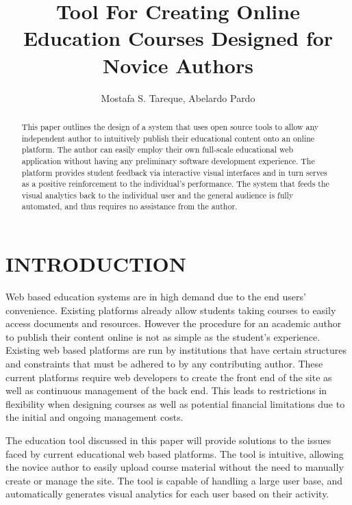 \documentclass[a4paper, 11pt, conference]{ieeeconf}
\title{\LARGE \bf Tool For Creating Online Education Courses Designed for Novice Authors }
\author{Mostafa S. Tareque, Abelardo Pardo}
\begin{document}
\maketitle
\pagestyle{empty}
\thispagestyle{empty}

\begin{abstract}
This paper outlines the design of a system that uses open source tools to allow any independent author to intuitively publish their educational content onto an online platform. The author can easily employ their own full-scale educational web application without having any preliminary software development experience. The platform provides student feedback via interactive visual interfaces and in turn serves as a positive reinforcement to the individual's performance. The system that feeds the visual analytics back to the individual user and the general audience is fully automated, and thus requires no assistance from the author.
\end{abstract}

\section{INTRODUCTION}
Web based education systems are in high demand due to the end users' convenience. Existing platforms already allow students taking courses to easily access documents and resources. However the procedure for an academic author to publish their content online is not as simple as the student's experience. Existing web based platforms are run by institutions that have certain structures and constraints that must be adhered to by any contributing author. These current platforms require web developers to create the front end of the site as well as continuous management of the back end. This leads to restrictions in flexibility when designing courses as well as potential financial limitations due to the initial and ongoing management costs.

The education tool discussed in this paper will provide solutions to the issues faced by current educational web based platforms. The tool is intuitive, allowing the novice author to easily upload course material without the need to manually create or manage the site. The tool is capable of handling a large user base, and automatically generates visual analytics for each user based on their activity. 
\end{document}
